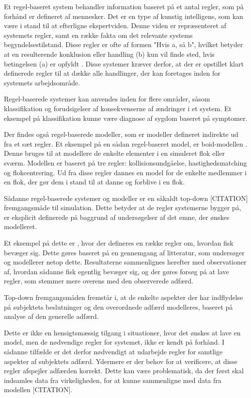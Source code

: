 Et regel-baseret system behandler information baseret på et antal regler, som på forhånd er defineret af mennesker. Det er en type af kunstig intelligens, som kan være i stand til at efterligne ekspertviden. Denne viden er repræsenteret af systemets regler, samt en række fakta om det relevante systems begyndelsestilstand. Disse regler er ofte af formen "Hvis a, så b", hvilket betyder at en resulterende konklusion eller handling (b) kun vil finde sted, hvis betingelsen (a) er opfyldt \cite{Grosan2011}. Disse systemer kræver derfor, at der er opstillet klart definerede regler til at dække alle handlinger, der kan foretages inden for systemets arbejdsområde.
\par
Regel-baserede systemer kan anvendes inden for flere områder, såsom klassifikation og forudsigelser af konsekvenserne af ændringer i et system. Et eksempel på klassifikation kunne være diagnose af sygdom baseret på symptomer. 
\par
Der findes også regel-baserede modeller, som er modeller defineret indirekte ud fra et sæt regler. Et eksempel på en sådan regel-baseret model, er boid-modellen \cite{reynolds1987}. Denne bruges til at modellere de enkelte elementer i en simuleret flok eller sværm. Modellen er baseret på tre regler: kollisionsundgåelse, hastighedsmatching og flokcentrering. Ud fra disse regler dannes en model for de enkelte medlemmer i en flok, der gør dem i stand til at danne og forblive i en flok.
\par
Sådanne regel-baserede systemer og modeller er en såkaldt top-down [CITATION] fremgangsmåde til simulation. Dette betyder at de regler systemerne bygger på, er eksplicit definerede på baggrund af undersøgelser af det emne, der ønskes modelleret.
\par
Et eksempel på dette er \cite{RAILSBACK199973}, hvor der defineres en række regler om, hvordan fisk bevæger sig. Dette gøres baseret på en gennemgang af litteratur, som undersøger og modellerer netop dette. Resultaterne sammenlignes herefter med observationer af, hvordan sådanne fisk egentlig bevæger sig, og der gøres forsøg på at lave regler, som stemmer mere overens med den observerede adfærd.
\par
Top-down fremgangsmåden fremstår i, at de enkelte aspekter der har indflydelse på subjektets beslutninger og den overordnede adfærd modelleres, baseret på analyse af den generelle adfærd. 
\par
Dette er ikke en hensigtsmæssig tilgang i situationer, hvor det ønskes at lave en model, men de nødvendige regler for systemet, ikke er kendt på forhånd. I sådanne tilfælde er det derfor nødvendigt at udarbejde regler for samtlige aspekter af subjektets adfærd. Ydermere er der behov for at verificere, at disse regler afspejler adfærden korrekt. Dette kan være problematisk, da der først skal indsamles data fra virkeligheden, for at kunne sammenligne med data fra modellen [CITATION].

